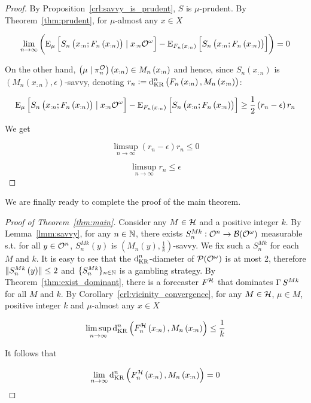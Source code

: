 \begin{proof}

By Proposition~\ref{crl:savvy_is_prudent}, $S$ is $\mu$-prudent. By Theorem~\ref{thm:prudent}, for $\mu$-almost any $x \in X$

$$\lim_{n \rightarrow \infty} {\left(\operatorname{E}_{\mu}\left[S_n\left(x_{:n};F_n\left(x_{:n}\right)\right) \mid x_{:n}\mathcal{O}^\omega\right]-\operatorname{E}_{F_n\left(x_{:n}\right)}\left[S_n\left(x_{:n};F_n\left(x_{:n}\right)\right)\right]\right)} = 0$$

On the other hand, $\left(\mu \mid \pi^{\mathcal{O}}_n\right)\left(x_{:n}\right) \in M_n\left(x_{:n}\right)$ and hence, since $S_n\left(x_{:n}\right)$ is $\left(M_n\left(x_{:n}\right),\epsilon\right)$-savvy, denoting $r_n:=\operatorname{d}_{\textnormal{KR}}^n\left(F_n\left(x_{:n}\right), M_n\left(x_{:n}\right)\right)$: 

$$\operatorname{E}_{\mu}\left[S_n\left(x_{:n};F_n\left(x_{:n}\right)\right) \mid x_{:n}\mathcal{O}^\omega\right]-\operatorname{E}_{F_n\left(x_{:n}\right)}\left[S_n\left(x_{:n};F_n\left(x_{:n}\right)\right)\right] \geq \frac{1}{2} \left(r_{n} - \epsilon\right) r_n$$

We get

$$\limsup_{n \rightarrow \infty} {\left(r_{n} - \epsilon\right) r_n} \leq 0$$

$$\limsup_{n \rightarrow \infty} {r_n} \leq \epsilon$$
\end{proof}

We are finally ready to complete the proof of the main theorem.

\begin{proof}[Proof of Theorem~\ref{thm:main}]

Consider any $M \in \mathcal{H}$ and a positive integer $k$. By Lemma~\ref{lmm:savvy}, for any $n \in \mathbb{N}$, there exists ${S^{Mk}_{n}: \mathcal{O}^n \rightarrow \mathcal{B}(\mathcal{O}^\omega)}$ measurable s.t. for all $y \in \mathcal{O}^n$, $S^{Mk}_{n}\left(y\right)$ is $\left(M_n(y),\frac{1}{k}\right)$-savvy. We fix such a $S^{Mk}_{n}$ for each $M$ and $k$. It is easy to see that the $\operatorname{d}_{\textnormal{KR}}^n$-diameter of $\mathcal{P}(\mathcal{O}^\omega)$ is at most 2, therefore $\lVert S^{Mk}_{n}\left(y\right) \rVert \leq 2$ and $\{S^{Mk}_{n}\}_{n \in \mathbb{N}}$ is a gambling strategy. By Theorem~\ref{thm:exist_dominant}, there is a forecaster $F^{\mathcal{H}}$ that dominates $\operatorname{\Gamma}{S}^{Mk}$ for all $M$ and $k$. By Corollary~\ref{crl:vicinity_convergence}, for any $M \in \mathcal{H}$, $\mu \in M$, positive integer $k$ and $\mu$-almost any $x \in X$

$$\limsup_{n \rightarrow \infty} {\operatorname{d}_{\textnormal{KR}}^n\left(F^{\mathcal{H}}_n\left(x_{:n}\right),M_n\left(x_{:n}\right)\right)} \leq \frac{1}{k}$$

It follows that

$$\lim_{n \rightarrow \infty} {\operatorname{d}_{\textnormal{KR}}^n\left(F^{\mathcal{H}}_n\left(x_{:n}\right),M_n\left(x_{:n}\right)\right)} = 0$$
\end{proof}

